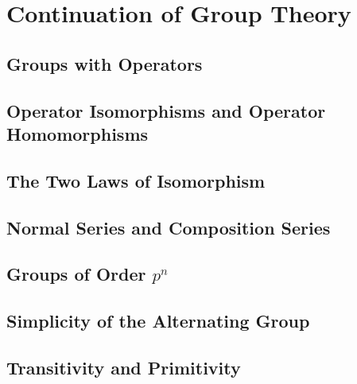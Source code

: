 \section{Continuation of Group Theory}

\subsection{Groups with Operators}

\subsection{Operator Isomorphisms and Operator Homomorphisms}

\subsection{The Two Laws of Isomorphism}

\subsection{Normal Series and Composition Series}

\subsection{Groups of Order $p^n$}

\subsection{Simplicity of the Alternating Group}

\subsection{Transitivity and Primitivity}